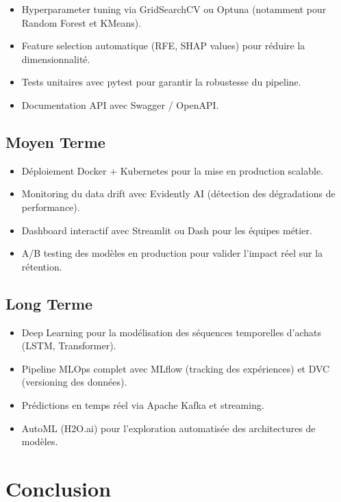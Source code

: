 \documentclass[12pt,a4paper]{article}
\begin{document}
\begin{itemize}
  \item Hyperparameter tuning via GridSearchCV ou Optuna (notamment pour Random Forest et KMeans).
  \item Feature selection automatique (RFE, SHAP values) pour réduire la dimensionnalité.
  \item Tests unitaires avec pytest pour garantir la robustesse du pipeline.
  \item Documentation API avec Swagger / OpenAPI.
\end{itemize}

\subsection{Moyen Terme}

\begin{itemize}
  \item Déploiement Docker + Kubernetes pour la mise en production scalable.
  \item Monitoring du data drift avec Evidently AI (détection des dégradations de performance).
  \item Dashboard interactif avec Streamlit ou Dash pour les équipes métier.
  \item A/B testing des modèles en production pour valider l'impact réel sur la rétention.
\end{itemize}

\subsection{Long Terme}

\begin{itemize}
  \item Deep Learning pour la modélisation des séquences temporelles d'achats (LSTM, Transformer).
  \item Pipeline MLOps complet avec MLflow (tracking des expériences) et DVC (versioning des données).
  \item Prédictions en temps réel via Apache Kafka et streaming.
  \item AutoML (H2O.ai) pour l'exploration automatisée des architectures de modèles.
\end{itemize}

\section{Conclusion}
\end{document}
